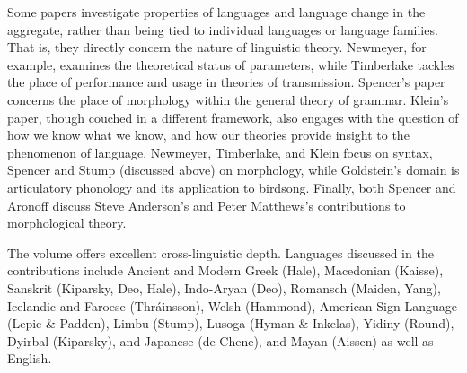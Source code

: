 \begin{refsection}
Some papers investigate properties of languages and language change in the aggregate, rather than being tied to individual languages or language families. That is, they directly concern the nature of linguistic theory. Newmeyer, for example, examines the theoretical status of parameters, while Timberlake tackles the place of performance and usage in theories of transmission. Spencer’s paper concerns the place of morphology within the general theory of grammar. Klein’s paper, though couched in a different framework, also engages with the question of how we know what we know, and how our theories provide insight to the phenomenon of language. Newmeyer, Timberlake, and Klein focus on syntax, Spencer and Stump (discussed above) on morphology, while Goldstein’s domain is articulatory phonology and its application to birdsong. Finally, both Spencer and Aronoff discuss Steve Anderson’s and Peter Matthews’s contributions to morphological theory.

The volume offers excellent cross-linguistic depth. Languages discussed in the contributions include Ancient and Modern Greek (Hale), Macedonian (Kaisse), Sanskrit (Kiparsky, Deo, Hale), Indo-Aryan (Deo), Romansch (Maiden, Yang), Icelandic and Faroese (Thráinsson), Welsh (Hammond), American Sign Language (Lepic \& Padden), Limbu (Stump), Lusoga (Hyman \& Inkelas), Yidiny (Round), Dyirbal (Kiparsky), and Japanese (de Chene), and Mayan (Aissen) as well as English.


\end{refsection}

